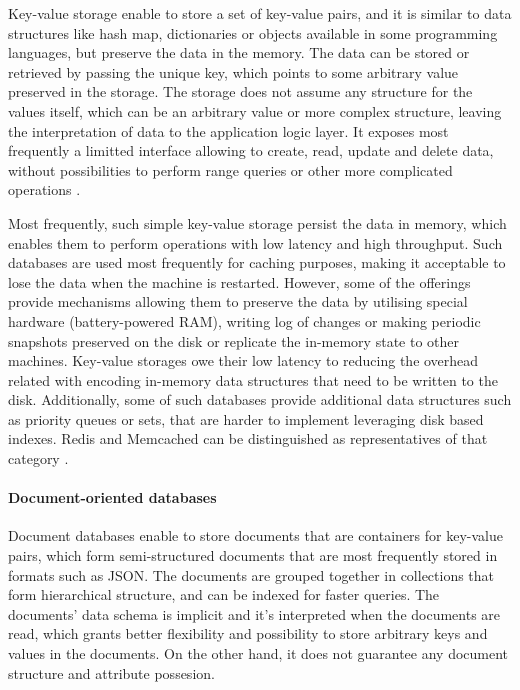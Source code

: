 Key-value storage enable to store a set of key-value pairs, and it is similar to data structures like hash map, dictionaries or objects available in some programming languages, but preserve the data in the memory. The data can be stored or retrieved by passing the unique key, which points to some arbitrary value preserved in the storage.
The storage does not assume any structure for the values itself, which can be an arbitrary value or more complex structure, leaving the interpretation of data to the application logic layer.
It exposes most frequently a limitted interface allowing to create, read, update and delete data, without possibilities to perform range queries or other more complicated operations \cite{NoSQLDatabaseSystemsSurveyDecisionGuidance}.

Most frequently, such simple key-value storage persist the data in memory, which enables them to perform operations with low latency and high throughput. Such databases are used most frequently for caching purposes, making it acceptable to lose the data when the machine is restarted. However, some of the offerings provide mechanisms allowing them to preserve the data by utilising special hardware (battery-powered RAM), writing log of changes or making periodic snapshots preserved on the disk or replicate the in-memory state to other machines. Key-value storages owe their low latency to reducing the overhead related with encoding in-memory data structures that need to be written to the disk. Additionally, some of such databases provide additional data structures such as priority queues or sets, that are harder to implement leveraging disk based indexes. Redis \cite{Redis} and Memcached \cite{Memcached} can be distinguished as representatives of that category \cite{DesignDataIntensiveApplications}. 

\paragraph{Document-oriented databases}

Document databases enable to store documents that are containers for key-value pairs, which form semi-structured documents that are most frequently stored in formats such as JSON. The documents are grouped together in collections that form hierarchical structure, and can be indexed for faster queries. The documents' data schema is implicit and it's interpreted when the documents are read, which grants better flexibility and possibility to store arbitrary keys and values in the documents. On the other hand, it does not guarantee any document structure and attribute possesion.


